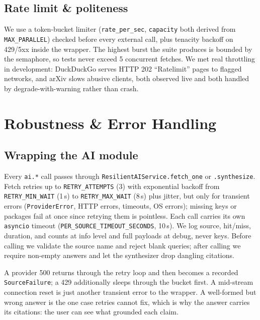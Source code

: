 \documentclass[11pt,a4paper]{article}
\begin{document}
\subsection{Rate limit \& politeness}

We use a token-bucket limiter (\texttt{rate\_per\_sec}, \texttt{capacity} both derived from \texttt{MAX\_PARALLEL}) checked before every external call, plus tenacity backoff on 429/5xx inside the wrapper. The highest burst the suite produces is bounded by the semaphore, so tests never exceed 5 concurrent fetches. We met real throttling in development: DuckDuckGo serves HTTP 202 ``Ratelimit'' pages to flagged networks, and arXiv slows abusive clients, both observed live and both handled by degrade-with-warning rather than crash.

\section{Robustness \& Error Handling}\label{sec:robustness}

\subsection{Wrapping the AI module}

Every \texttt{ai.*} call passes through \texttt{ResilientAIService.fetch\_one} or \texttt{.synthesize}. Fetch retries up to \texttt{RETRY\_ATTEMPTS} (3) with exponential backoff from \texttt{RETRY\_MIN\_WAIT} (1\,s) to \texttt{RETRY\_MAX\_WAIT} (8\,s) plus jitter, but only for transient errors (\texttt{ProviderError}, HTTP errors, timeouts, OS errors); missing keys or packages fail at once since retrying them is pointless. Each call carries its own \texttt{asyncio} timeout (\texttt{PER\_SOURCE\_TIMEOUT\_SECONDS}, 10\,s). We log source, hit/miss, duration, and counts at info level and full payloads at debug, never keys. Before calling we validate the source name and reject blank queries; after calling we require non-empty answers and let the synthesizer drop dangling citations.

A provider 500 returns through the retry loop and then becomes a recorded \texttt{SourceFailure}; a 429 additionally sleeps through the bucket first. A mid-stream connection reset is just another transient error to the wrapper. A well-formed but wrong answer is the one case retries cannot fix, which is why the answer carries its citations: the user can see what grounded each claim.
\end{document}
